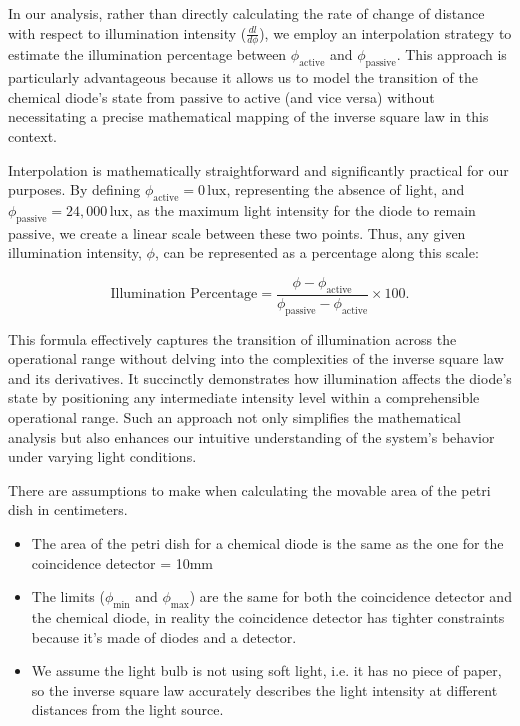 \begin{tcolorbox}[colback=red!5!white,colframe=blue!75!black,title=Assumptions for mapping light intensity to radial distance,label={ass:assumptions-light-intensity}]
    In our analysis, rather than directly calculating the rate of change of distance with respect to illumination intensity (\(\frac{dl}{d\phi}\)), we employ an interpolation strategy to estimate the illumination percentage between \(\phi_{\text{active}}\) and \(\phi_{\text{passive}}\). This approach is particularly advantageous because it allows us to model the transition of the chemical diode's state from passive to active (and vice versa) without necessitating a precise mathematical mapping of the inverse square law in this context. 

    Interpolation is mathematically straightforward and significantly practical for our purposes. By defining \(\phi_{\text{active}} = 0\,\text{lux}\), representing the absence of light, and \(\phi_{\text{passive}} = 24,000\,\text{lux}\), as the maximum light intensity for the diode to remain passive, we create a linear scale between these two points. Thus, any given illumination intensity, \(\phi\), can be represented as a percentage along this scale:
    
    \[
    \text{Illumination Percentage} = \frac{\phi - \phi_{\text{active}}}{\phi_{\text{passive}} - \phi_{\text{active}}} \times 100.
    \]
    
    This formula effectively captures the transition of illumination across the operational range without delving into the complexities of the inverse square law and its derivatives. It succinctly demonstrates how illumination affects the diode's state by positioning any intermediate intensity level within a comprehensible operational range. Such an approach not only simplifies the mathematical analysis but also enhances our intuitive understanding of the system's behavior under varying light conditions.
\end{tcolorbox}
\begin{tcolorbox}[colback=red!5!white,colframe=blue!75!black,title=Assumptions for Light Intensity Calculation,label={ass:assumptions-light-intensity-calculation}]
    There are assumptions to make when calculating the movable area of the petri dish in centimeters.
\begin{itemize}
    \item The area of the petri dish for a chemical diode is the same as the one for the coincidence detector = 10mm
    \item The limits ($\phi_{\text{min}}$ and $\phi_{\text{max}}$) are the same for both the coincidence detector and the chemical diode, in reality the coincidence detector has tighter constraints because it's made of diodes and a detector.
    \item We assume the light bulb is not using soft light, i.e. it has no piece of paper, so the inverse square law accurately describes the light intensity at different distances from the light source. 
\end{itemize}
\end{tcolorbox}

